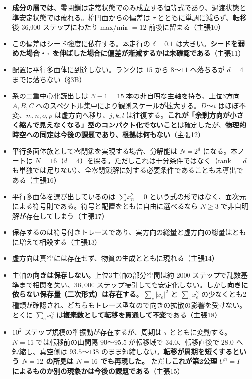 \documentclass[
  10pt,
]{ltjsarticle}
\providecommand{\tightlist}{%
  \setlength{\itemsep}{0pt}\setlength{\parskip}{0pt}}
\begin{document}
\begin{itemize}
\tightlist
\item
  \textbf{成分の層では}、零閉鎖は定常状態でのみ成立する恒等式であり、過渡状態と準安定状態では破れる。楕円面からの偏差は
  \(\tau\) とともに単調に減らず、転移後 36,000 ステップにわたり max/min
  \(= 12\) 前後に留まる（主張10）
\item
  この偏差はシード強度に依存する。本走行の \(\delta = 0.1\)
  は大きい。\textbf{シードを弱めた場合・\(\tau\)
  を伸ばした場合に偏差が漸減するかは未確認である}（主張11）
\item
  配置は平行多面体に到達しない。ランクは \(15\) から \(8\)〜\(11\)
  へ落ちるが \(d = 4\) までは落ちない（§3B）
\item
  系の二重中心化読出しは \(N-1 = 15\) 本の非自明な主軸を持ち、上位3方向
  \(A,B,C\) へのスペクトル集中により観測スケールが拡大する。\(D\)〜\(i\)
  はほぼ不変、\(m,n,o,p\) は虚方向へ移り、\(j,k,l\)
  は往復する。\textbf{これが「余剰方向が小さく縮んで見えなくなる」型のコンパクト化でないこと}は確定したが、\textbf{物理的時空への同定は今後の課題であり、根拠は何もない}（主張12）
\item
  平行多面体族として零閉鎖を実現する場合、分解能は \(N = 2^d\)
  になる。本ノートは
  \(N=16\)（\(d=4\)）を採る。ただしこれは十分条件ではなく（rank \(= d\)
  も単独では足りない）、全零閉鎖解に対する必要条件であることも未導出である（主張16）
\item
  平行多面体を選び出しているのは \(\sum x_n^2 = 0\)
  という式の形ではなく、面次元による符号則である。符号と配置をともに自由に選べるなら
  \(N \ge 3\) で非自明解が存在してしまう（主張17）
\item
  保存するのは符号付きトレースであり、実方向の総量と虚方向の総量はともに増えて相殺する（主張13）
\item
  虚方向は真空には存在せず、物質の生成とともに現れる（主張14）
\item
  主軸の\textbf{向きは保存しない}。上位3主軸の部分空間は約 2000
  ステップで乱数基準まで相関を失い、\(36{,}000\)
  ステップ掃引しても安定化しない。しかし\textbf{向きに依らない保存量（二次形式）は存在する}。\(\sum_e\lvert x_e\rvert^2\)
  と \(\sum_e x_e^2\)
  の少なくとも2種類が確認され、どちらもトレース型なので向きの拡散の影響を受けない。とくに
  \(\sum_e x_e^2\)
  は\textbf{複素数として転移を貫通して不変}である（主張18）
\item
  \(10^2\) ステップ規模の準振動が存在するが、周期は \(\tau\)
  とともに変動する。\(N=16\) では転移前の山間隔 \(90\)〜\(95.5\)
  が転移域で \(34.0\)、転移直後で \(28.0\) へ短縮し、真空側は
  \(93.5\)〜\(138\) のまま短縮しない。\textbf{転移が周期を短くするという
  \(N=12\) の所見は \(N=16\) でも再現した。} ただし\textbf{これが第2公理
  \(U^n = I\) によるものか別の現象かは今後の課題である}（主張15）
\end{itemize}
\end{document}

